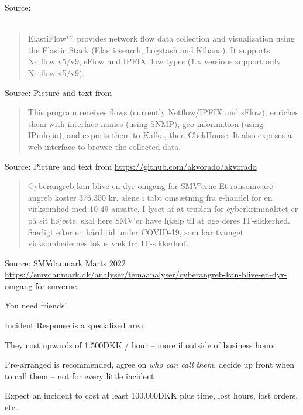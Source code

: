 \documentclass[Screen16to9,17pt]{foils}
\begin{document}
Source: \\{\footnotesize
{}\\
}





\begin{quote}
  ElastiFlow™ provides network flow data collection and visualization using the Elastic Stack (Elasticsearch, Logstash and Kibana). It supports Netflow v5/v9, sFlow and IPFIX flow types (1.x versions support only Netflow v5/v9).
\end{quote}
Source: Picture and text from  \\



\begin{quote}
This program receives flows (currently Netflow/IPFIX and sFlow), enriches them with interface names (using SNMP), geo information (using IPinfo.io), and exports them to Kafka, then ClickHouse. It also exposes a web interface to browse the collected data.
\end{quote}
Source: Picture and text from \url{https://github.com/akvorado/akvorado}







\begin{quote}
Cyberangreb kan blive en dyr omgang for SMV’erne
Et ransomware angreb koster 376.350 kr. alene i tabt omsætning fra e-handel for en virksomhed med 10-49 ansatte. I lyset af at truslen for cyberkriminalitet er på sit højeste, skal flere SMV’er have hjælp til at øge deres IT-sikkerhed. Særligt efter en hård tid under COVID-19, som har tvunget virksomhedernes fokus væk fra IT-sikkerhed.
\end{quote}
Source: SMVdanmark Marts 2022 \url{https://smvdanmark.dk/analyser/temaanalyser/cyberangreb-kan-blive-en-dyr-omgang-for-smverne}

\begin{list2}
\item You need friends!

\item Incident Response is a specialized area

\item They cost upwards of 1.500DKK / hour -- more if outside of business hours
\item Pre-arranged is recommended, agree on \emph{who can call them}, decide up front when to call them -- not for every little incident
\item Expect an incident to cost at least 100.000DKK plus time, lost hours, lost orders, etc.
\end{list2}
\end{document}
